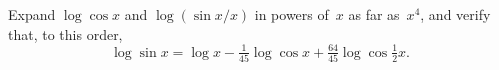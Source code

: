 Expand $\log\cos x$ and $\log(\sin x/x)$ in powers of~$x$ as far as~$x^{4}$, and
verify that, to this order,
\[
\log\sin x
  = \log x - \tfrac{1}{45} \log\cos x + \tfrac{64}{45}\log\cos \tfrac{1}{2}x.
\]

